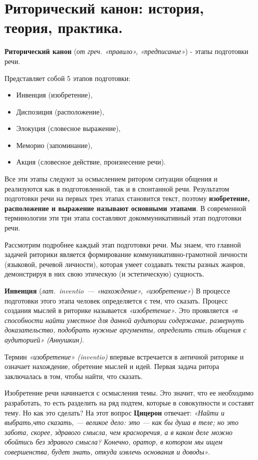 \section{Риторический канон: история, теория, практика.}
	 \hspace{\parindent}\textbf{Риторический канон} (\textit{от греч. «правило», «предписание»}) - этапы подготовки речи. 

     Представляет собой 5 этапов подготовки:
     \begin{itemize}
         \item Инвенция (изобретение),
         \item Диспозиция (расположение),
         \item Элокуция (словесное выражение),
         \item Меморио (запоминание),
         \item Акция (словесное действие, произнесение речи).
     \end{itemize}

Все эти этапы следуют за осмыслением ритором ситуации общения и реализуются как в подготовленной, так и в спонтанной речи. 
Результатом подготовки речи на первых трех этапах становится текст, поэтому \textbf{изобретение, расположение и выражение называют основными этапами}. В современной терминологии эти три этапа составляют докоммуникативный этап подготовки речи.
    
Рассмотрим подробнее каждый этап подготовки речи.
Мы знаем, что главной задачей риторики является формирование коммуникативно-грамотной личности (языковой, речевой личности), которая умеет создавать тексты разных жанров, демонстрируя в них свою этическую (и эстетическую) сущность.

\textbf{Инвенция} (\textit{лат. inventio — «нахождение», «изобретение»})
В процессе подготовки этого этапа человек определяется с тем, что сказать. 
Процесс создания мыслей в риторике называется \textit{«изобретение»}.
Это проявляется \textit{«в способности найти уместное для данной аудитории содержание, развернуть доказательство, подобрать нужные аргументы, определить стиль общения с аудиторией» (Аннушкин)}.

Термин \textit{«изобретение» (inventio)} впервые встречается в античной риторике и означает нахождение, обретение мыслей и идей. Первая задача ритора заключалась в том, чтобы найти, что сказать.

Изобретение речи начинается с осмысления темы. 
Это значит, что ее необходимо разработать, то есть разделить на ряд подтем, которые в совокупности и составят тему. 
Но как это сделать? 
На этот вопрос \textbf{Цицерон} отвечает: \textit{«Найти и выбрать,что сказать, — великое дело: это — как бы душа в теле; но это забота, скорее, здравого смысла, чем красноречия, а в каком деле можно обойтись без здравого смысла? Конечно, оратор, в котором мы ищем совершенства, будет знать, откуда извлечь основания и доводы»}.


